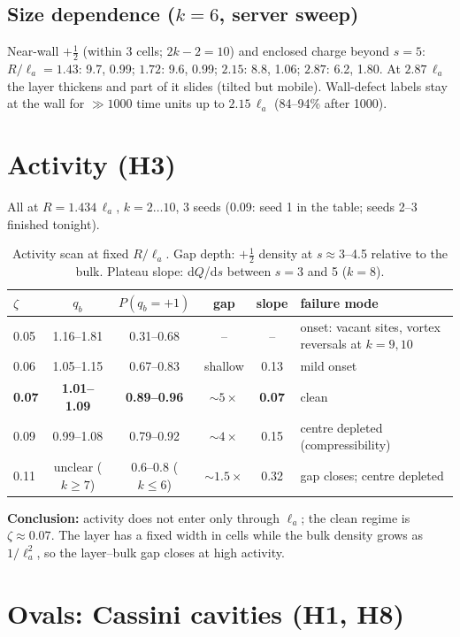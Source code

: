 \documentclass[11pt,a4paper]{article}
\newcommand{\la}{\ell_a}
\begin{document}
\subsection{Size dependence ($k=6$, server sweep)}
Near-wall $+\frac12$ (within 3 cells; $2k-2=10$) and enclosed charge beyond $s=5$:
$R/\la=1.43$: 9.7, 0.99; $1.72$: 9.6, 0.99; $2.15$: 8.8, 1.06; $2.87$: 6.2, 1.80.
At $2.87\,\la$ the layer thickens and part of it slides (tilted but mobile). Wall-defect labels stay at the wall for
$\gg1000$ time units up to $2.15\,\la$ (84--94\% after 1000).

\section{Activity (H3)}
All at $R=1.434\,\la$, $k=2\dots10$, 3 seeds (0.09: seed 1 in the table; seeds 2--3 finished tonight).
\begin{table}[h]\centering\small
\caption{Activity scan at fixed $R/\la$. Gap depth: $+\frac12$ density at $s\approx3$--4.5 relative to the bulk. Plateau slope: d$Q$/d$s$ between $s=3$ and 5 ($k=8$).}
\begin{tabularx}{\textwidth}{lccccX}\toprule
$\zeta$ & $q_b$ & $P(q_b=+1)$ & gap & slope & failure mode\\\midrule
0.05 & 1.16--1.81 & 0.31--0.68 & -- & -- & onset: vacant sites, vortex reversals at $k=9,10$\\
0.06 & 1.05--1.15 & 0.67--0.83 & shallow & 0.13 & mild onset\\
\textbf{0.07} & \textbf{1.01--1.09} & \textbf{0.89--0.96} & $\sim5\times$ & \textbf{0.07} & clean\\
0.09 & 0.99--1.08 & 0.79--0.92 & $\sim4\times$ & 0.15 & centre depleted (compressibility)\\
0.11 & unclear ($k\ge7$) & 0.6--0.8 ($k\le6$) & $\sim1.5\times$ & 0.32 & gap closes; centre depleted\\\bottomrule
\end{tabularx}
\end{table}
\textbf{Conclusion:} activity does not enter only through $\la$; the clean regime is $\zeta\approx0.07$.
The layer has a fixed width in cells while the bulk density grows as $1/\la^2$, so the layer--bulk gap closes at
high activity.

\section{Ovals: Cassini cavities (H1, H8)}\label{sec:ovals}
\end{document}
